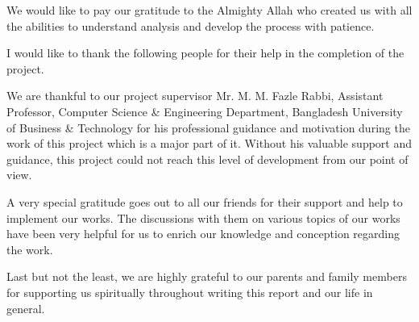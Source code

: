 
We would like to pay our gratitude to the Almighty Allah who created us with all the abilities to understand analysis and develop the process with patience.

I would like to thank the following people for their help in the completion of the project.

We are thankful to our project supervisor Mr. M. M. Fazle Rabbi, Assistant Professor, Computer Science \& Engineering Department, Bangladesh University of Business \& Technology for his professional guidance and motivation during the work of this project which is a major part of it. Without his valuable support and guidance, this project could not reach this level of development from our point of view.

A very special gratitude goes out to all our friends for their support and help to implement our works. The discussions with them on various topics of our works have been very helpful for us to enrich our knowledge and conception regarding the work.

Last but not the least, we are highly grateful to our parents and family members for supporting us spiritually throughout writing this report and our life in general.

\endinput

